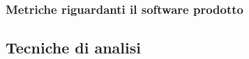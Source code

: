     \subsubsection{Metriche riguardanti il software prodotto}







  \subsection{Tecniche di analisi}
